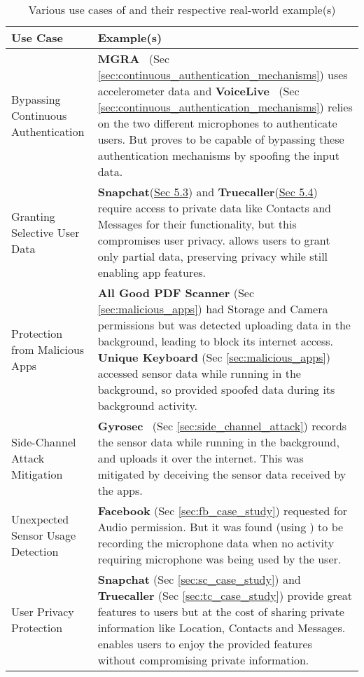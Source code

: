 \begin{table}[h]
    {\centering
    \begin{tabular} {>{\arraybackslash\centering}m{2.5cm} >{\arraybackslash}m{9.5cm}}
        \hline
         \textbf{Use Case} & \textbf{Example(s)}\\
         \hline
         Bypassing Continuous Authentication & 
         \textbf{MGRA}~\cite{hong2016mgra} (Sec \ref{sec:continuous_authentication_mechanisms}) uses accelerometer data and \textbf{VoiceLive}~\cite{zhang2016voicelive} (Sec \ref{sec:continuous_authentication_mechanisms}) relies on the two different microphones to authenticate users. But \framework{} proves to be capable of bypassing these authentication mechanisms by spoofing the input data. \\
         \hline
         Granting Selective User Data & 
         \textbf{Snapchat}(\hyperref[sec:sc_case_study]{Sec 5.3}) and \textbf{Truecaller}(\hyperref[sec:tc_case_study]{Sec 5.4}) require access to private data like Contacts and Messages for their functionality, but this compromises user privacy. \framework{} allows users to grant only partial data, preserving privacy while still enabling app features. \\
         \hline
         Protection from Malicious Apps & 
         \textbf{All Good PDF Scanner} (Sec \ref{sec:malicious_apps}) had Storage and Camera permissions but was detected uploading data in the background, leading \framework{} to block its internet access. \textbf{Unique Keyboard} (Sec \ref{sec:malicious_apps}) accessed sensor data while running in the background, so \framework{} provided spoofed data during its background activity.
         \\
         \hline
         Side-Channel Attack Mitigation & 
         \textbf{Gyrosec}~\cite{lin2019motion} (Sec \ref{sec:side_channel_attack}) records the sensor data while running in the background, and uploads it over the internet. This was mitigated by deceiving the sensor data received by the apps.  \\
         \hline
         Unexpected Sensor Usage Detection & 
         \textbf{Facebook} (Sec \ref{sec:fb_case_study}) requested for Audio permission. But it was found (using \framework{}) to be recording the microphone data when no activity requiring microphone was being used by the user.\\
         \hline
         User Privacy Protection & 
         \textbf{Snapchat} (Sec \ref{sec:sc_case_study}) and \textbf{Truecaller} (Sec \ref{sec:tc_case_study}) provide great features to users but at the cost of sharing private information like Location, Contacts and Messages. \framework{} enables users to enjoy the provided features without compromising private information.\\
         \hline
    \end{tabular}
    }
    \caption{Various use cases of \framework{} and their respective real-world example(s)}
    \label{tab:highlights}
\end{table}